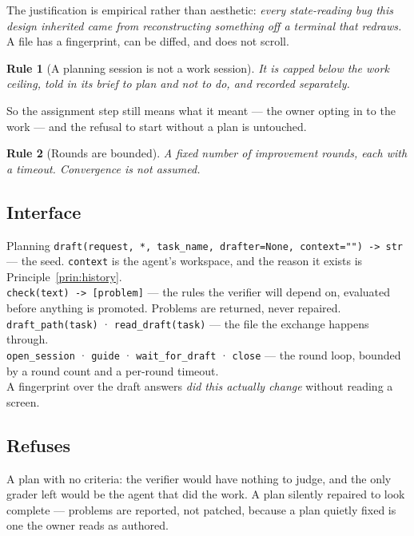 \documentclass[11pt]{article}
\newtheorem{drule}{Rule}
\newcommand{\code}[1]{\texttt{\small #1}}
\begin{document}
The justification is empirical rather than aesthetic: \emph{every state-reading bug this design inherited came from reconstructing something off a terminal that redraws.} A file has a fingerprint, can be diffed, and does not scroll.

\begin{drule}[A planning session is not a work session]
\label{rule:plansession}
It is capped below the work ceiling, told in its brief to plan and not to do, and recorded separately.
\end{drule}

So the assignment step still means what it meant --- the owner opting in to the work --- and the refusal to start without a plan is untouched.

\begin{drule}[Rounds are bounded]
\label{rule:rounds}
A fixed number of improvement rounds, each with a timeout. Convergence is not assumed.
\end{drule}

\subsection{Interface}

\begin{specbox}{Planning}
\code{draft(request, *, task\_name, drafter=None, context="") -> str} --- the seed. \code{context} is the agent's workspace, and the reason it exists is Principle~\ref{prin:history}.\\[3pt]
\code{check(text) -> [problem]} --- the rules the verifier will depend on, evaluated before anything is promoted. Problems are returned, never repaired.\\[3pt]
\code{draft\_path(task)} · \code{read\_draft(task)} --- the file the exchange happens through.\\[3pt]
\code{open\_session} · \code{guide} · \code{wait\_for\_draft} · \code{close} --- the round loop, bounded by a round count and a per-round timeout.\\[3pt]
A fingerprint over the draft answers \emph{did this actually change} without reading a screen.
\end{specbox}

\subsection{Refuses}

A plan with no criteria: the verifier would have nothing to judge, and the only grader left would be the agent that did the work. A plan silently repaired to look complete --- problems are reported, not patched, because a plan quietly fixed is one the owner reads as authored.
\end{document}
